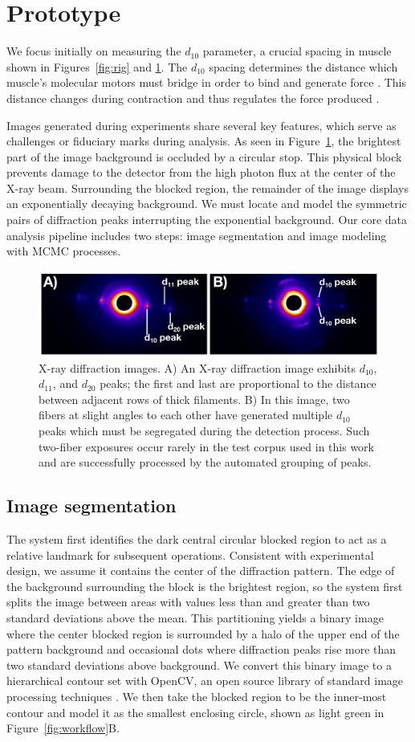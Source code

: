 \documentclass{llncs}
\newcommand{\figureimgs}{
\begin{figure}[tbp]
  \centering
  \includegraphics[width=.8\linewidth]{figures/x_ray_image_montage}
  \caption{\label{fig:imgs}
  	X-ray diffraction images.
    A) An X-ray diffraction image exhibits $d_{10}$, $d_{11}$, and
    $d_{20}$ peaks; the first and last are proportional to the
    distance between adjacent rows of thick filaments. B) In this
    image, two fibers at slight angles to each other have generated
    multiple $d_{10}$ peaks which must be segregated during the
    detection process. Such two-fiber exposures occur rarely in the 
    test corpus used in this work and are successfully processed by 
    the automated grouping of peaks. 
	}
	\vspace{-10pt}
\end{figure}
}
\begin{document}
\section{Prototype}
\label{sec:proto}


We focus initially on measuring the $d_{10}$ parameter, a crucial
spacing in muscle shown in Figures~\ref{fig:rig} and \ref{fig:imgs}.
The $d_{10}$ spacing determines the distance which muscle's molecular
motors must bridge in order to bind and generate force
\cite{Williams2013}. This distance changes during contraction and thus
regulates the force produced \cite{George2013}.

Images generated during experiments share several key features, which
serve as challenges or fiduciary marks during analysis. As seen in
Figure~\ref{fig:imgs}, the brightest part of the image background is
occluded by a circular stop. This physical block prevents damage to
the detector from the high photon flux at the center of the X-ray
beam. Surrounding the blocked region, the remainder of the image
displays an exponentially decaying background. We must locate and
model the symmetric pairs of diffraction peaks interrupting the
exponential background. Our core data analysis pipeline includes two
steps: image segmentation and image modeling with MCMC processes.

\figureimgs

\subsection{Image segmentation}
\label{subsec:imgseg}

The system first identifies the dark central circular blocked region
to act as a relative landmark for subsequent operations. Consistent
with experimental design, we assume it contains the center of the
diffraction pattern. The edge of the background surrounding the block
is the brightest region, so the system first splits the image between
areas with values less than and greater than two standard deviations
above the mean. This partitioning yields a binary image where the
center blocked region is surrounded by a halo of the upper end of the
pattern background and occasional dots where diffraction peaks rise
more than two standard deviations above background. We convert this
binary image to a hierarchical contour set with OpenCV, an open source
library of standard image processing techniques \cite{opencv}. We then
take the blocked region to be the inner-most contour and model it as
the smallest enclosing circle, shown as light green in
Figure~\ref{fig:workflow}B. 
\end{document}
